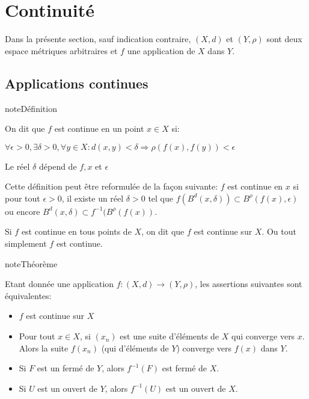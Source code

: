 \documentclass[letterpaper,10pt,french]{sphinxmanual}
\begin{document}
\section{Continuité}
\label{\detokenize{continue:continuite}}\label{\detokenize{continue::doc}}
\sphinxAtStartPar
Dans la présente section, sauf indication contraire, \((X, d)\) et \((Y, \rho)\) sont deux espace métriques arbitraires et \(f\) une application de \(X\) dans \(Y\).


\subsection{Applications continues}
\label{\detokenize{continue:applications-continues}}
\begin{sphinxadmonition}{note}{Définition}

\sphinxAtStartPar
On dit que \(f\) est continue en un point \(x\in X\) si:

\sphinxAtStartPar
\(\forall \epsilon>0, \exists \delta>0, \forall y \in X: d(x, y)<\delta \Rightarrow \rho(f(x), f(y))<\epsilon\)

\sphinxAtStartPar
Le réel \(\delta\) dépend de \(f, x\)  et \(\epsilon\)
\end{sphinxadmonition}

\sphinxAtStartPar
Cette définition peut être reformulée de la façon suivante: \(f\) est continue en \(x\) si pour tout \(\epsilon>0\), il existe un réel \(\delta>0\) tel que \(f(B^d(x, \delta)) \subset B^\rho(f(x), \epsilon)\) ou encore \(B^d(x, \delta) \subset f^{-1}(B^\rho(f(x))\).

\sphinxAtStartPar
Si \(f\) est continue en tous points de \(X\), on dit que \(f\) est continue sur \(X\). Ou tout simplement \(f\) est continue.

\begin{sphinxadmonition}{note}{Théorème}

\sphinxAtStartPar
Etant donnée une application \(f : (X, d) \to (Y, \rho)\), les assertions suivantes sont équivalentes:
\begin{itemize}
\item {} 
\sphinxAtStartPar
\(f\) est continue sur \(X\)

\item {} 
\sphinxAtStartPar
Pour tout \(x \in X\), si \((x_n)\) est une suite d’éléments de \(X\) qui converge vers \(x\). Alors la suite \(f(x_n)\) (qui d’éléments de \(Y\)) converge vers \(f(x)\) dans \(Y\).

\item {} 
\sphinxAtStartPar
Si \(F\) est un fermé de \(Y\), alors \(f^{-1}(F)\) est fermé de \(X\).

\item {} 
\sphinxAtStartPar
Si \(U\) est un ouvert de \(Y\), alors \(f^{-1}(U)\) est un ouvert de \(X\).

\end{itemize}
\end{sphinxadmonition}
\end{document}
